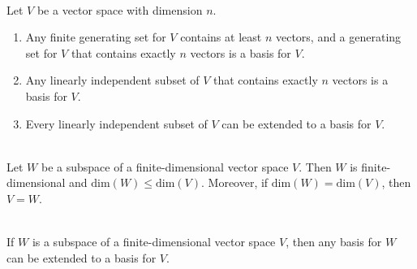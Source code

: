 \begin{corollary}
	\hfill\\
	Let $V$ be a vector space with dimension $n$.
	\begin{enumerate}
		\item Any finite generating set for $V$ contains at least $n$ vectors, and a generating set for $V$ that contains exactly $n$ vectors is a basis for $V$.

		\item Any linearly independent subset of $V$ that contains exactly $n$ vectors is a basis for $V$.

		\item Every linearly independent subset of $V$ can be extended to a basis for $V$.
	\end{enumerate}
\end{corollary}

\begin{theorem}
	\hfill\\
	Let $W$ be a subspace of a finite-dimensional vector space $V$. Then $W$ is finite-dimensional and $\text{dim}(W) \leq \text{dim}(V)$. Moreover, if $\text{dim}(W) = \text{dim}(V)$, then $V = W$.
\end{theorem}

\begin{corollary}
	\hfill\\
	If $W$ is a subspace of a finite-dimensional vector space $V$, then any basis for $W$ can be extended to a basis for $V$.
\end{corollary}


